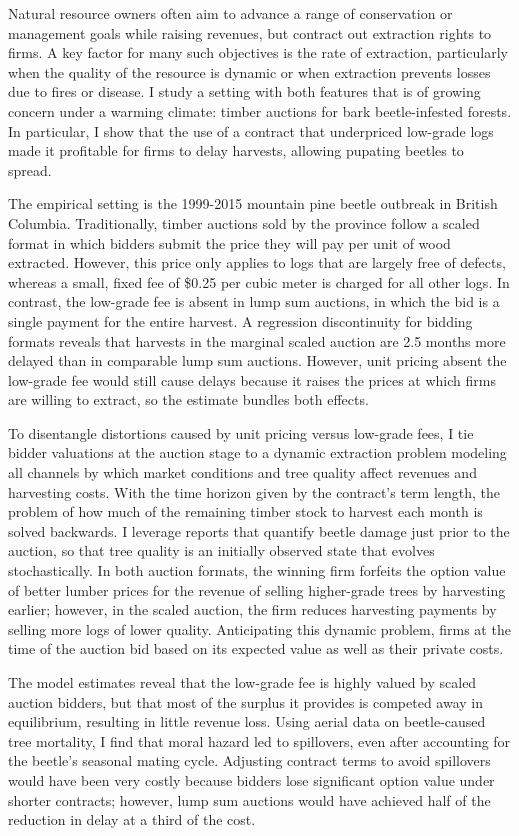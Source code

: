 \documentclass[11pt,letterpaper]{article}
\begin{document}
Natural resource owners often aim to advance a range of conservation or management goals while raising revenues, but contract out extraction rights to firms. A key factor for many such objectives is the rate of extraction, particularly when the quality of the resource is dynamic or when extraction prevents losses due to fires or disease. I study a setting with both features that is of growing concern under a warming climate: timber auctions for bark beetle-infested forests. In particular, I show that the use of a contract that underpriced low-grade logs made it profitable for firms to delay harvests, allowing pupating beetles to spread.

The empirical setting is the 1999-2015 mountain pine beetle outbreak in British Columbia. Traditionally, timber auctions sold by the province follow a scaled format in which bidders submit the price they will pay per unit of wood extracted. However, this price only applies to logs that are largely free of defects, whereas a small, fixed fee of \$0.25 per cubic meter is charged for all other logs. In contrast, the low-grade fee is absent in lump sum auctions, in which the bid is a single payment for the entire harvest. A regression discontinuity for bidding formats reveals that harvests in the marginal scaled auction are 2.5 months more delayed than in comparable lump sum auctions. However, unit pricing absent the low-grade fee would still cause delays because it raises the prices at which firms are willing to extract, so the estimate bundles both effects.

To disentangle distortions caused by unit pricing versus low-grade fees, I tie bidder valuations at the auction stage to a dynamic extraction problem modeling all channels by which market conditions and tree quality affect revenues and harvesting costs. With the time horizon given by the contract's term length, the problem of how much of the remaining timber stock to harvest each month is solved backwards. I leverage reports that quantify beetle damage just prior to the auction, so that tree quality is an initially observed state that evolves stochastically. In both auction formats, the winning firm forfeits the option value of better lumber prices for the revenue of selling higher-grade trees by harvesting earlier; however, in the scaled auction, the firm reduces harvesting payments by selling more logs of lower quality. Anticipating this dynamic problem, firms at the time of the auction bid based on its expected value as well as their private costs.

The model estimates reveal that the low-grade fee is highly valued by scaled auction bidders, but that most of the surplus it provides is competed away in equilibrium, resulting in little revenue loss. Using aerial data on beetle-caused tree mortality, I find that moral hazard led to spillovers, even after accounting for the beetle's seasonal mating cycle. Adjusting contract terms to avoid spillovers would have been very costly because bidders lose significant option value under shorter contracts; however, lump sum auctions would have achieved half of the reduction in delay at a third of the cost.
\end{document}
